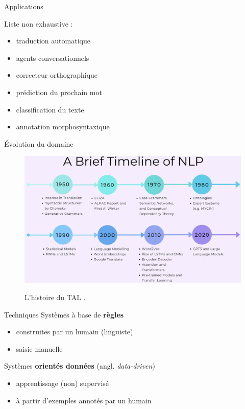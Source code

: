 \documentclass[xetex,xcolor={table,usenames,dvipsnames}]{beamer}
\newcommand{\bolder}[1]{{\color{purple}\bfseries#1}}
\begin{document}
\begin{frame}{Applications}
	
	Liste non exhaustive :
	\begin{itemize}
		\item traduction automatique 
		\item agents conversationnels 
		\item correcteur orthographique
		\item prédiction du prochain mot
		\item classification du texte
		\item annotation morphosyntaxique
	\end{itemize}
	
\end{frame}

\begin{frame}{Évolution du domaine}
\begin{figure}[h] %
	\centering
	\includegraphics[width=\linewidth]{img/evolution.png}
	\label{fig:evolution}
	\caption{L'histoire du \textsc{TAL} \citep{chiusano2022}.}
\end{figure}

\end{frame}




\begin{frame}{Techniques}
Systèmes à base de \bolder{règles}
\begin{itemize}
	\item construites par un humain (linguiste)
	\item saisie manuelle
\end{itemize} 

Systèmes \bolder{orientés données} (angl. \textit{data-driven})
\begin{itemize}
	\item apprentissage (non) supervisé
	\item à partir d'exemples annotés par un humain
\end{itemize}
\end{frame}
\end{document}
